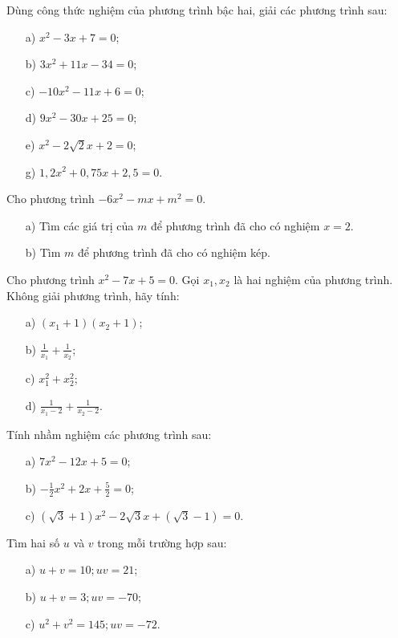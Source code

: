 \documentclass[%
    fontsize=12pt,%
    chapterprefix=false,%
    open=right,%
    twoside=false,%
    numbers=noenddot,%
    headings=optiontohead,%
    final,%
    DIV=15,%
    parskip=half %
]{scrbook}
\begin{document}
\begin{tuluan}

\item Dùng công thức nghiệm của phương trình bậc hai, giải các phương trình sau:
\begin{enumerate}[label=\alph*)]
  \item[a)] $ x^2 - 3x + 7 = 0 $;
  \item[b)] $ 3x^2 + 11x - 34 = 0 $;
  \item[c)] $ -10x^2 - 11x + 6 = 0 $;
  \item[d)] $ 9x^2 - 30x + 25 = 0 $;
  \item[e)] $ x^2 - 2\sqrt{2}x + 2 = 0 $;
  \item[g)] $ 1,2x^2 + 0,75x + 2,5 = 0 $.
\end{enumerate}

\item Cho phương trình $ -6x^2 - mx + m^2 = 0 $.
\begin{enumerate}[label=\alph*)]
  \item[a)] Tìm các giá trị của $ m $ để phương trình đã cho có nghiệm $ x = 2 $.
  \item[b)] Tìm $ m $ để phương trình đã cho có nghiệm kép.
\end{enumerate}

\item Cho phương trình $ x^2 - 7x + 5 = 0 $. Gọi $ x_1, x_2 $ là hai nghiệm của phương trình. Không giải phương trình, hãy tính:
\begin{enumerate}[label=\alph*)]
  \item[a)] $ (x_1 + 1)(x_2 + 1) $;
  \item[b)] $ \frac{1}{x_1} + \frac{1}{x_2} $;
  \item[c)] $ x_1^2 + x_2^2 $;
  \item[d)] $ \frac{1}{x_1 - 2} + \frac{1}{x_2 - 2} $.
\end{enumerate}

\item Tính nhầm nghiệm các phương trình sau:
\begin{enumerate}[label=\alph*)]
  \item[a)] $ 7x^2 - 12x + 5 = 0 $;
  \item[b)] $ -\frac{1}{2}x^2 + 2x + \frac{5}{2} = 0 $;
  \item[c)] $ (\sqrt{3} + 1)x^2 - 2\sqrt{3}x + (\sqrt{3} - 1) = 0 $.
\end{enumerate}

\item Tìm hai số $ u $ và $ v $ trong mỗi trường hợp sau:
\begin{enumerate}[label=\alph*)]
  \item[a)] $ u + v = 10; uv = 21 $;
  \item[b)] $ u + v = 3; uv = -70 $;
  \item[c)] $ u^2 + v^2 = 145; uv = -72 $.
\end{enumerate}


\end{tuluan}
\end{document}
